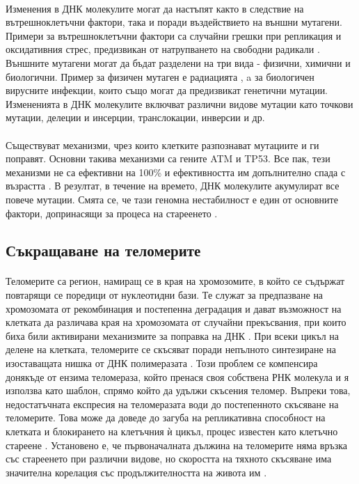 \documentclass[pdftex,cyrillic,14pt,a4page,twoside,openright]{extreport}
\begin{document}
\paragraph{}
Изменения в ДНК молекулите могат да настъпят както в следствие на вътрешноклетъчни фактори, така и поради въздействието на външни мутагени. Примери за вътрешноклетъчни фактори са случайни грешки при репликация и оксидативния стрес, предизвикан от натрупването на свободни радикали \cite{wang1998}. Външните мутагени могат да бъдат разделени на три вида - физични, химични и биологични. Пример за физичен мутаген е радиацията \cite{breimer1988}, a за биологичен вирусните инфекции, които също могат да предизвикат генетични мутации. Измененията в ДНК молекулите включват различни видове мутации като точкови мутации, делеции и инсерции, транслокации, инверсии и др.\\\\

Съществуват механизми, чрез които клетките разпознават мутациите и ги поправят. Основни такива механизми са гените ATM и TP53. Все пак, тези механизми не са ефективни на 100\% и ефективността им допълнително спада с възрастта \cite{auley2017}. В резултат, в течение на времето, ДНК молекулите акумулират все повече мутации. Смята се, че тази геномна нестабилност е един от основните фактори, допринасящи за процеса на стареенето \cite{vijg2013}.

\subsection{Съкращаване на теломерите}
\paragraph{}
Теломерите са регион, намиращ се в края на хромозомите, в който се съдържат повтарящи се поредици от нуклеотидни бази. Те служат за предпазване на хромозомата от рекомбинация и постепенна деградация и дават възможност на клетката да различава края на хромозомата от случайни прекъсвания, при които биха били активирани механизмите за поправка на ДНК \cite{griffith1999}. При всеки цикъл на делене на клетката, теломерите се скъсяват поради непълното синтезиране на изоставащата нишка от ДНК полимеразата \cite{koliada2015}. Този проблем се компенсира донякъде от ензима теломераза, който пренася своя собствена РНК молекула и я използва като шаблон, спрямо който да удължи скъсения теломер. Въпреки това, недостатъчната експресия на теломеразата води до постепенното скъсяване на теломерите. Това може да доведе до загуба на репликативна способност на клетката и блокирането на клетъчния ѝ цикъл, процес известен като клетъчно стареене \cite{muraki2012}. Установено е, че първоначалната дължина на теломерите няма връзка със стареенето при различни видове, но скоростта на тяхното скъсяване има значителна корелация със продължителността на живота им \cite{whittemore2019}.
\end{document}
